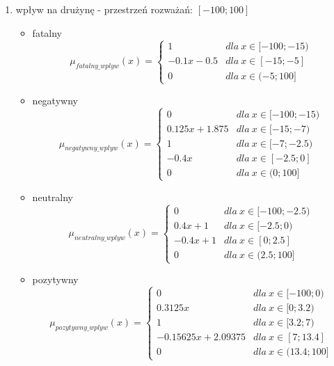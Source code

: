 \documentclass{classrep}
\begin{document}
\begin{enumerate}
    \item wpływ na drużynę - przestrzeń rozważań: $[-100;100]$
    \begin{itemize}
        \item fatalny
        \begin{equation}
            \mu_{fatalny\_wplyw}(x) = \left\{\begin{matrix} 1 & dla \: x\in[-100;-15) \\ -0.1x - 0.5 & dla \: x\in [-15; -5] \\ 0 & dla \: x\in (-5;100] \end{matrix}\right.
        \end{equation}
         \item negatywny
        \begin{equation}
            \mu_{negatywny\_wplyw}(x) = \left\{\begin{matrix} 0 & dla \: x\in [-100;-15) \\ 0.125x + 1.875 & dla \: x\in[-15;-7) \\ 1 & dla \: x\in [-7;-2.5) \\ -0.4x & dla \: x\in [-2.5; 0] \\ 0 & dla \: x\in (0;100] \end{matrix}\right.
        \end{equation}
        \item neutralny
        \begin{equation}
            \mu_{neutralny\_wplyw}(x) = \left\{\begin{matrix} 0 & dla \: x\in [-100;-2.5) \\ 0.4x + 1 & dla \: x\in[-2.5;0) \\ -0.4x + 1 & dla \: x\in [0; 2.5]\\ 0 & dla \: x\in (2.5;100] \end{matrix}\right.
        \end{equation}
        \item pozytywny
        \begin{equation}
            \mu_{pozytywny\_wplyw}(x) = \left\{\begin{matrix} 0 & dla \: x\in [-100;0) \\ 0.3125x & dla \: x\in[0;3.2) \\ 1 & dla \: x\in [3.2;7) \\ -0.15625x + 2.09375 & dla \: x\in [7; 13.4]\\ 0 & dla \: x\in (13.4;100] \end{matrix}\right.
        \end{equation}

\end{itemize}
\end{enumerate}
\end{document}
